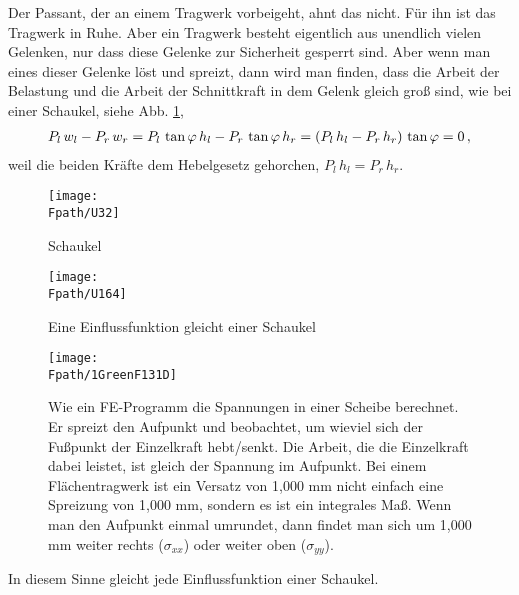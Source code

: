 Der Passant, der an einem Tragwerk vorbeigeht, ahnt das nicht. F\"{u}r ihn ist das Tragwerk in Ruhe. Aber ein Tragwerk besteht eigentlich aus unendlich vielen Gelenken, nur dass diese Gelenke zur Sicherheit gesperrt sind. Aber wenn man eines dieser Gelenke l\"{o}st und spreizt, dann wird man finden, dass die Arbeit der Belastung und die Arbeit der Schnittkraft in dem Gelenk gleich gro{\ss} sind, wie bei einer Schaukel, siehe Abb. \ref{U32},
\begin{align}
P_l \, w_l - P_r \, w_r = P_l \,\tan \varphi \, h_l - P_r \, \tan \varphi \, h_r
= (P_l \, h_l - P_r \, h_r) \,\tan \varphi  = 0\,,
\end{align}
weil die beiden Kr\"{a}fte dem Hebelgesetz gehorchen, $P_l \, h_l = P_r \, h_r$.\\
\begin{figure}[tbp]
\centering
\if {} \sidecaption \fi
\texttt{[image: \\Fpath/U32]}
\caption{Schaukel} \label{U32}
\end{figure}%
\begin{figure}[tbp]
\centering
\if {} \sidecaption \fi
\texttt{[image: \\Fpath/U164]}
\caption{Eine Einflussfunktion gleicht einer Schaukel} \label{U164A}
\end{figure}%

\begin{figure}[tbp]
\centering
\if {} \sidecaption \fi
\texttt{[image: \\Fpath/1GreenF131D]}
\caption{Wie ein FE-Programm die Spannungen in einer Scheibe berechnet. Er spreizt den Aufpunkt und beobachtet, um
wieviel sich der Fu{\ss}punkt der Einzelkraft hebt/senkt. Die Arbeit, die die Einzelkraft dabei leistet, ist gleich der Spannung im Aufpunkt. Bei einem Fl\"{a}chentragwerk ist ein Versatz von 1,000 mm nicht einfach eine Spreizung von 1,000 mm, sondern es ist ein integrales Ma{\ss}. Wenn man den Aufpunkt einmal umrundet, dann findet man sich um 1,000 mm weiter rechts ($\sigma_{xx}$) oder weiter oben ($\sigma_{yy}$).
}\label{1GreenF131}
\end{figure}

\hspace*{-12pt}\colorbox{highlightBlue}{\parbox{0.98\textwidth}{ In diesem Sinne gleicht jede Einflussfunktion einer Schaukel. }}\\


